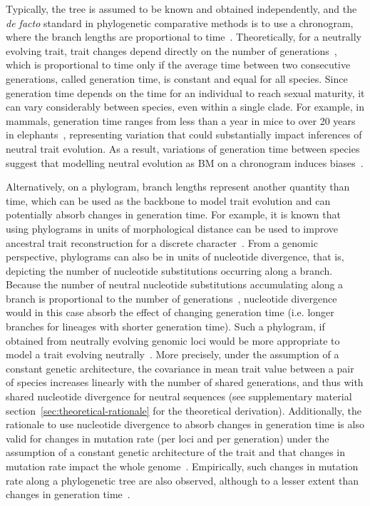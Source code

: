 \documentclass{article}
\begin{document}
Typically, the tree is assumed to be known and obtained independently, and the \textit{de facto} standard in phylogenetic comparative methods is to use a chronogram, where the branch lengths are proportional to time~\citep{felsenstein_phylogenies_1985, harmon_phylogenetic_2018}.
Theoretically, for a neutrally evolving trait, trait changes depend directly on the number of generations~\citep{hansen_translating_1996}, which is proportional to time only if the average time between two consecutive generations, called generation time, is constant and equal for all species.
Since generation time depends on the time for an individual to reach sexual maturity, it can vary considerably between species, even within a single clade.
For example, in mammals, generation time ranges from less than a year in mice to over 20 years in elephants~\citep{demagalhaes_database_2009}, representing variation that could substantially impact inferences of neutral trait evolution.
As a result, variations of generation time between species suggest that modelling neutral evolution as BM on a chronogram induces biases~\citep{litsios_effects_2012}.

Alternatively, on a phylogram, branch lengths represent another quantity than time, which can be used as the backbone to model trait evolution and can potentially absorb changes in generation time.
For example, it is known that using phylograms in units of morphological distance can be used to improve ancestral trait reconstruction for a discrete character~\citep{wilson_chronogram_2022}.
From a genomic perspective, phylograms can also be in units of nucleotide divergence, that is, depicting the number of nucleotide substitutions occurring along a branch.
Because the number of neutral nucleotide substitutions accumulating along a branch is proportional to the number of generations~\citep{kimura_evolutionary_1968, kimura_neutral_1983}, nucleotide divergence would in this case absorb the effect of changing generation time (i.e. longer branches for lineages with shorter generation time).
Such a phylogram, if obtained from neutrally evolving genomic loci would be more appropriate to model a trait evolving neutrally~\citep{latrille_detecting_2024}.
More precisely, under the assumption of a constant genetic architecture, the covariance in mean trait value between a pair of species increases linearly with the number of shared generations, and thus with shared nucleotide divergence for neutral sequences (see supplementary material section~\ref{sec:theoretical-rationale} for the theoretical derivation).
Additionally, the rationale to use nucleotide divergence to absorb changes in generation time is also valid for changes in mutation rate (per loci and per generation) under the assumption of a constant genetic architecture of the trait and that changes in mutation rate impact the whole genome~\citep{latrille_detecting_2024}.
Empirically, such changes in mutation rate along a phylogenetic tree are also observed, although to a lesser extent than changes in generation time~\citep{bergeron_evolution_2023}.
\end{document}
